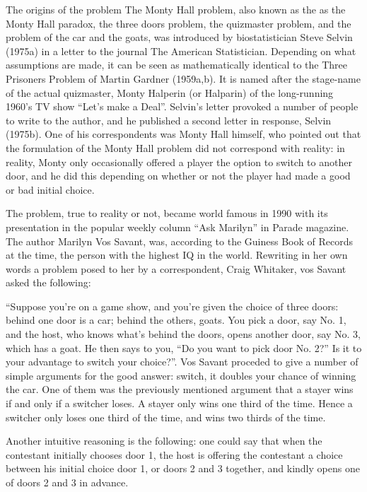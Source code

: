 The origins of the problem
The Monty Hall problem, also known as the as the Monty Hall paradox, the three doors problem, the quizmaster problem, and the problem of the car and the goats, was introduced by biostatistician Steve Selvin (1975a) in a letter to the journal The American Statistician. Depending on what assumptions are made, it can be seen as mathematically identical to the Three Prisoners Problem of Martin Gardner (1959a,b). It is named after the stage-name of the actual quizmaster, Monty Halperin (or Halparin) of the long-running 1960's TV show ``Let's make a Deal''. Selvin's letter provoked a number of people to write to the author, and he published a second letter in response, Selvin (1975b). One of his correspondents was Monty Hall himself, who pointed out that the formulation of the Monty Hall problem did not correspond with reality: in reality, Monty only occasionally offered a player the option to switch to another door, and he did this depending on whether or not the player had made a good or bad initial choice.

The problem, true to reality or not, became world famous in 1990 with its presentation in the popular weekly column ``Ask Marilyn'' in Parade magazine. The author Marilyn Vos Savant, was, according to the Guiness Book of Records at the time, the person with the highest IQ in the world. Rewriting in her own words a problem posed to her by a correspondent, Craig Whitaker, vos Savant asked the following:

``Suppose you're on a game show, and you're given the choice of three doors: behind one door is a car; behind the others, goats. You pick a door, say No. 1, and the host, who knows what's behind the doors, opens another door, say No. 3, which has a goat. He then says to you, ``Do you want to pick door No. 2?'' Is it to your advantage to switch your choice?''.
Vos Savant proceded to give a number of simple arguments for the good answer: switch, it doubles your chance of winning the car. One of them was the previously mentioned argument that a stayer wins if and only if a switcher loses. A stayer only wins one third of the time. Hence a switcher only loses one third of the time, and wins two thirds of the time.

Another intuitive reasoning is the following: one could say that when the contestant initially chooses door 1, the host is offering the contestant a choice between his initial choice door 1, or doors 2 and 3 together, and kindly opens one of doors 2 and 3 in advance.

